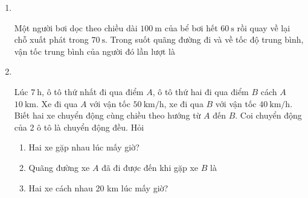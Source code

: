 \begin{enumerate}[label=\bfseries Câu \arabic*:]
\item {}\\
{Một người bơi dọc theo chiều dài $\SI{100}{\meter}$ của bể bơi hết $\SI{60}{\second}$ rồi quay về lại chỗ xuất phát trong $\SI{70}{\second}$. Trong suốt quãng đường đi và về tốc độ trung bình, vận tốc trung bình của người đó lần lượt là
}


\item {}\\
{Lúc $\SI{7}{\hour}$, ô tô thứ nhất đi qua điểm $A$, ô tô thứ hai đi qua điểm $B$ cách $A$ $\SI{10}{\kilo\meter}$. Xe đi qua $A$ với vận tốc $\SI{50}{\kilo\meter/\hour}$, xe đi qua $B$ với vận tốc $\SI{40}{\kilo\meter/\hour}$. Biết hai xe chuyển động cùng chiều theo hướng từ $A$ đến $B$. Coi chuyển động của 2 ô tô là chuyển động đều. Hỏi
\begin{enumerate}[label=\alph*)]
	\item Hai xe gặp nhau lúc mấy giờ?
\item Quãng đường xe $A$ đã đi được đến khi gặp xe $B$ là
\item Hai xe cách nhau 20 km lúc mấy giờ?
\end{enumerate}
}


\end{enumerate}
